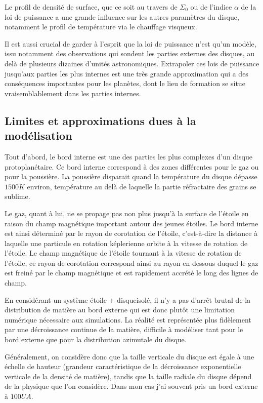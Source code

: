 Le profil de densité de surface, que ce soit au travers de $\Sigma_0$ ou de l'indice $\alpha$ de la loi de puissance a une
grande influence sur les autres paramètres du disque, notamment le profil de température via le chauffage visqueux. 

Il est aussi crucial de garder à l'esprit que la loi de puissance n'est qu'un modèle, issu notamment des observations qui
sondent les parties externes des disques, au delà de plusieurs dizaines d'unités astronomiques. Extrapoler ces lois de puissance
jusqu'aux parties les plus internes est une très grande approximation qui a des conséquences importantes pour les planètes, dont
le lieu de formation se situe vraisemblablement dans les parties internes.

\subsection{Limites et approximations dues à la modélisation}
Tout d'abord, le bord interne est une des parties les plus complexes d'un disque protoplanétaire. Ce bord interne correspond à des zones différentes pour le gaz ou pour la poussière. La poussière disparait quand la température du disque dépasse $1500\unit{K}$ environ, température au delà de laquelle la partie réfractaire des grains se sublime. 

Le gaz, quant à lui, ne se propage pas non plus jusqu'à la surface de l'étoile en raison du champ magnétique important autour des jeunes étoiles. Le bord interne est ainsi déterminé par le rayon de corotation de l'étoile, c'est-à-dire la distance à laquelle une particule en rotation képlerienne orbite à la vitesse de rotation de l'étoile. Le champ magnétique de l'étoile tournant à la vitesse de rotation de l'étoile, ce rayon de corotation correspond ainsi au rayon en dessous duquel le gaz est freiné par le champ magnétique et est rapidement accrété le long des lignes de champ. 

\bigskip

En considérant un système \og étoile + disque\fg isolé, il n'y a pas d'arrêt brutal de la distribution de matière au bord externe qui est donc plutôt une limitation numérique nécessaire aux simulations. La réalité est représentée plus fidèlement par une décroissance continue de la matière, difficile à modéliser tant pour le bord externe que pour la distribution azimutale du disque. 

Généralement, on considère donc que la taille verticale du disque est égale à une échelle de hauteur (grandeur caractéristique de la décroissance exponentielle verticale de la densité de matière), tandis que la taille radiale du disque dépend de la physique que l'on considère. Dans mon cas j'ai souvent pris un bord externe à $100\unit{UA}$.

